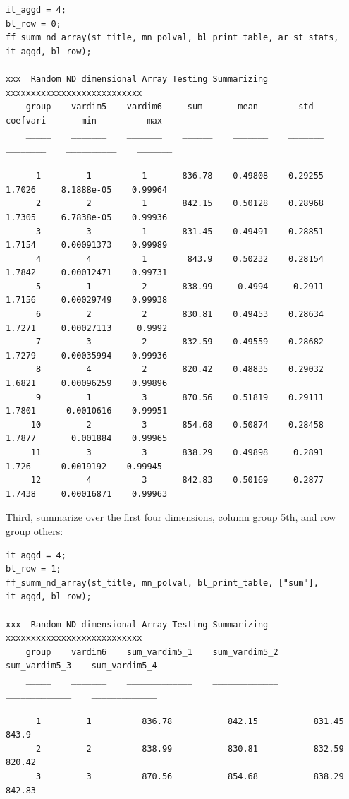\documentclass[
]{book}
\begin{document}
\begin{verbatim}
it_aggd = 4; 
bl_row = 0; 
ff_summ_nd_array(st_title, mn_polval, bl_print_table, ar_st_stats, it_aggd, bl_row);

xxx  Random ND dimensional Array Testing Summarizing  xxxxxxxxxxxxxxxxxxxxxxxxxxx
    group    vardim5    vardim6     sum       mean        std      coefvari       min          max  
    _____    _______    _______    ______    _______    _______    ________    __________    _______

      1         1          1       836.78    0.49808    0.29255     1.7026     8.1888e-05    0.99964
      2         2          1       842.15    0.50128    0.28968     1.7305     6.7838e-05    0.99936
      3         3          1       831.45    0.49491    0.28851     1.7154     0.00091373    0.99989
      4         4          1        843.9    0.50232    0.28154     1.7842     0.00012471    0.99731
      5         1          2       838.99     0.4994     0.2911     1.7156     0.00029749    0.99938
      6         2          2       830.81    0.49453    0.28634     1.7271     0.00027113     0.9992
      7         3          2       832.59    0.49559    0.28682     1.7279     0.00035994    0.99936
      8         4          2       820.42    0.48835    0.29032     1.6821     0.00096259    0.99896
      9         1          3       870.56    0.51819    0.29111     1.7801      0.0010616    0.99951
     10         2          3       854.68    0.50874    0.28458     1.7877       0.001884    0.99965
     11         3          3       838.29    0.49898     0.2891      1.726      0.0019192    0.99945
     12         4          3       842.83    0.50169     0.2877     1.7438     0.00016871    0.99963
\end{verbatim}

Third, summarize over the first four dimensions, column group 5th, and
row group others:

\begin{verbatim}
it_aggd = 4; 
bl_row = 1; 
ff_summ_nd_array(st_title, mn_polval, bl_print_table, ["sum"], it_aggd, bl_row);

xxx  Random ND dimensional Array Testing Summarizing  xxxxxxxxxxxxxxxxxxxxxxxxxxx
    group    vardim6    sum_vardim5_1    sum_vardim5_2    sum_vardim5_3    sum_vardim5_4
    _____    _______    _____________    _____________    _____________    _____________

      1         1          836.78           842.15           831.45            843.9    
      2         2          838.99           830.81           832.59           820.42    
      3         3          870.56           854.68           838.29           842.83    
\end{verbatim}
\end{document}
